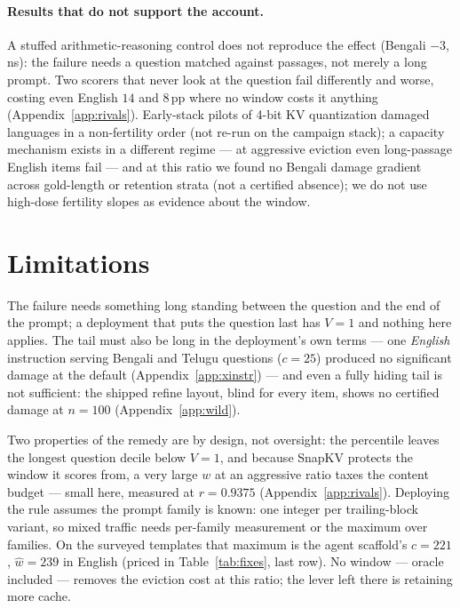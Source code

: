 \documentclass{article}
\begin{document}
\paragraph{Results that do not support the account.}
A stuffed arithmetic-reasoning control does not reproduce the
effect (Bengali $-3$, ns): the failure needs a question matched
against passages, not merely a long prompt. Two scorers that never look at the question
\citep{devoto2025expected, oren2024transformers} fail differently and
worse, costing even English $14$ and $8$\,pp where no window costs it
anything (Appendix~\ref{app:rivals}). Early-stack pilots of 4-bit KV
quantization damaged languages in a non-fertility order (not re-run on
the campaign stack); a capacity mechanism exists in a different regime
--- at aggressive eviction even long-passage English items fail ---
and at this ratio we found no Bengali damage gradient across
gold-length or retention strata (not a certified absence); we do not
use high-dose fertility slopes as evidence about the window.

\section{Limitations}

The failure needs something long standing between the question and
the end of the prompt; a deployment that puts the question last has
$V{=}1$ and nothing here applies. The tail must also be long in the deployment's own terms --- one
\emph{English} instruction serving Bengali and Telugu questions
($c{=}25$) produced no significant damage at the default
(Appendix~\ref{app:xinstr}) --- and even a
fully hiding tail is not sufficient: the shipped refine layout,
blind for every item, shows no certified damage at $n{=}100$
(Appendix~\ref{app:wild}).

Two properties of the remedy are by design, not oversight: the
percentile leaves the longest question decile below $V{=}1$, and
because SnapKV protects the window it scores from, a very large $w$
at an aggressive ratio taxes the content budget --- small here,
measured at $r{=}0.9375$ (Appendix~\ref{app:rivals}).
Deploying the rule assumes the prompt family is known: one integer
per trailing-block variant, so mixed traffic needs per-family
measurement or the maximum over families. On the surveyed templates
that maximum is the agent scaffold's $c{=}221$, $\hat w{=}239$ in
English (priced in Table~\ref{tab:fixes}, last row). No window ---
oracle included --- removes the eviction cost at this ratio; the lever
left there is retaining more cache.
\end{document}
